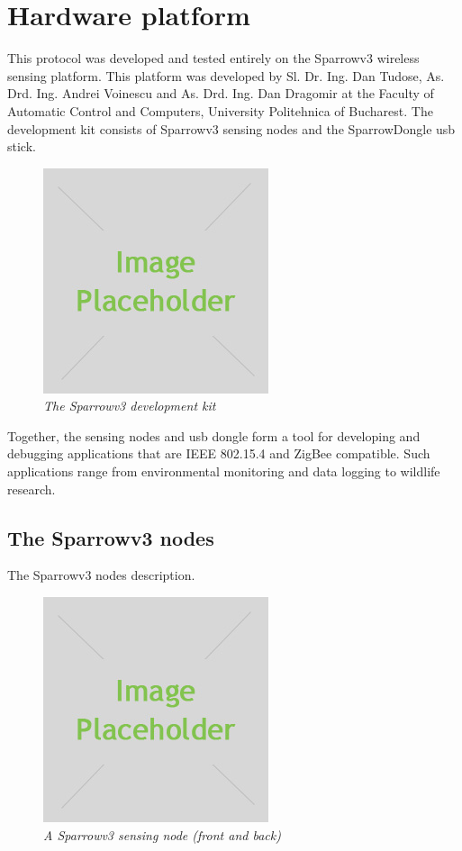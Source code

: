 
\chapter{Hardware platform}

This protocol was developed and tested entirely on the Sparrowv3 wireless
sensing platform. This platform was developed by Sl. Dr. Ing. Dan Tudose, As.
Drd. Ing. Andrei Voinescu and As. Drd. Ing. Dan Dragomir at the Faculty of
Automatic Control and Computers, University Politehnica of Bucharest. The
development kit consists of Sparrowv3 sensing nodes and the SparrowDongle usb stick.

\begin{figure}[ht]
	\begin{center}
		\includegraphics{img/placeholder.jpg}
	\end{center}
	\caption{\small \itshape{The Sparrowv3 development kit}}
\end{figure}

Together, the sensing nodes and usb dongle form a tool for developing and
debugging applications that are IEEE 802.15.4 and ZigBee compatible. Such
applications range from environmental monitoring and data logging to wildlife
research.

\section{The Sparrowv3 nodes}

The Sparrowv3 nodes description.

\begin{figure}[ht]
	\begin{center}
		\includegraphics{img/placeholder.jpg}
	\end{center}
	\caption{\small \itshape{A Sparrowv3 sensing node (front and back)}}
\end{figure}

